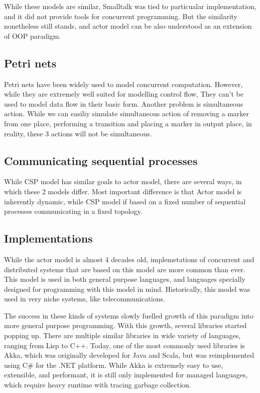While these models are similar, Smalltalk was tied to particualar implementation, and it did not provide
tools for concurrent programming. But the similarity nonetheless still stands, and actor model can be also understood as
an extension of OOP paradigm.

\subsection{Petri nets}
Petri nets have been widely used to model concurrent computation. However, while they are extremely well suited
for modelling control flow, They can't be used to model data flow in their basic form. Another problem is
simultaneous action. While we can easiliy simulate simultaneous action of removing a marker from one place, performing
a transition and placing a marker in output place, in reality, these 3 actions will not be simultaneous.

\subsection{Communicating sequential processes}
While CSP model has similar goals to actor model, there are several ways, in which these 2 models differ.
Most important difference is that Actor model is inherently
dynamic, while CSP model if based on a fixed number of sequential processes communicating in a fixed topology\cite{Hoare:1985:CSP:3921}.

\subsection{Implementations}
While the actor model is almost 4 decades old, implemetations of concurrent and distributed systems that
are based on this model are more common than ever. This model is used in both general purpose languages, and
languages specially designed for programming with this model in mind. Historically, this model
was used in very niche systems, like telecommunications.

The success in these kinds of systems slowly fuelled growth of this paradigm into more general purpose programming. With this
growth, several libraries started popping up. There are multiple similar libraries in
wide variety of languages, ranging from Lisp to C++. Today, one of the most commonly used libraries is Akka\cite{web:akka}, which was originally
developed for Java and Scala, but was reimplemented using C\# for the .NET platform. While Akka is extremely easy to use,
extensible, and performant, it is still only implemented for managed languages, which require heavy runtime with tracing garbage collection.

